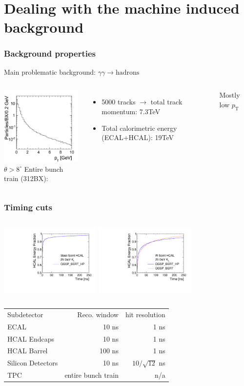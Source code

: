 \documentclass{beamer}
\begin{document}
\section[Bkg treatment]{Dealing with the machine induced background}
\begin{frame}
\frametitle{Background properties}
Main problematic background: $\gamma\gamma\to\textrm{hadrons}$
\begin{columns}[c]
\column{6cm}
\centering
\includegraphics[width=4cm]{../SIDWorkshop/ggPT}\\
$\theta>8^\circ$
\column{6cm}
Entire bunch train (312BX):
\begin{itemize}
  \item 5000 tracks $\to$ total track momentum: \alert{7.3TeV}
  \item Total calorimetric energy (ECAL+HCAL): \alert{19TeV}
\end{itemize}
Mostly low $p_{\textrm{T}}$
\end{columns}
\end{frame}
\begin{frame}
\frametitle{Timing cuts}
\begin{columns}[c]
\column{5cm}
\centering
\includegraphics[width=5cm]{../SIDWorkshop/hcalTimingSteel.pdf}
\column{5cm}
\centering
\includegraphics[width=5cm]{../SIDWorkshop/hcalTimingTungsten.pdf}
\end{columns}
\begin{center}
\begin{tabular}{lrr}
Subdetector &Reco. window &hit resolution\\
ECAL &10 ns &1 ns\\
HCAL Endcaps &10 ns &1 ns\\
HCAL Barrel &100 ns &1 ns\\
Silicon Detectors &10 ns &$10/\sqrt{12}$ ns\\
TPC & entire bunch train & n/a
\end{tabular}
\end{center}
\end{frame}
\end{document}
